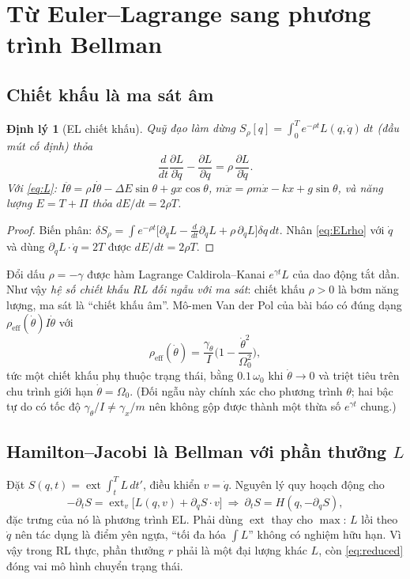 \documentclass[11pt,a4paper]{article}
\newtheorem{dinhly}{Định lý}
\theoremstyle{remark}
\begin{document}
\section{Từ Euler--Lagrange sang phương trình Bellman}
\subsection{Chiết khấu là ma sát âm}
\begin{dinhly}[EL chiết khấu]\label{th:disc}
Quỹ đạo làm dừng $S_\rho[q]=\int_0^Te^{-\rho t}L(q,\dot q)\,dt$ (đầu mút cố định) thỏa
\begin{equation}
\frac{d}{dt}\frac{\partial L}{\partial\dot q}-\frac{\partial L}{\partial q}=\rho\,\frac{\partial L}{\partial\dot q}.
\label{eq:ELrho}
\end{equation}
Với \eqref{eq:L}: $I\ddot\theta=\rho I\dot\theta-\Delta E\sin\theta+gx\cos\theta$, $m\ddot x=\rho m\dot x-kx+g\sin\theta$, và năng lượng $E=T+\Pi$ thỏa $dE/dt=2\rho T$.
\end{dinhly}
\begin{proof}
Biến phân: $\delta S_\rho=\int e^{-\rho t}\big[\partial_qL-\tfrac{d}{dt}\partial_{\dot q}L+\rho\,\partial_{\dot q}L\big]\delta q\,dt$. Nhân \eqref{eq:ELrho} với $\dot q$ và dùng $\partial_{\dot q}L\cdot\dot q=2T$ được $dE/dt=2\rho T$.
\end{proof}
Đổi dấu $\rho=-\gamma$ được hàm Lagrange Caldirola--Kanai $e^{\gamma t}L$ của dao động tắt dần. Như vậy \emph{hệ số chiết khấu RL đối ngẫu với ma sát}: chiết khấu $\rho>0$ là bơm năng lượng, ma sát là ``chiết khấu âm''. Mô-men Van der Pol của bài báo có đúng dạng $\rho_{\text{eff}}(\dot\theta)I\dot\theta$ với
\begin{equation}
\rho_{\text{eff}}(\dot\theta)=\frac{\gamma_\theta}{I}\Big(1-\frac{\dot\theta^2}{\Omega_0^2}\Big),
\label{eq:rhoeff}
\end{equation}
tức một chiết khấu phụ thuộc trạng thái, bằng $0.1\,\omega_0$ khi $\dot\theta\to0$ và triệt tiêu trên chu trình giới hạn $\dot\theta=\Omega_0$. (Đối ngẫu này chính xác cho phương trình $\theta$; hai bậc tự do có tốc độ $\gamma_\theta/I\ne\gamma_x/m$ nên không gộp được thành một thừa số $e^{\gamma t}$ chung.)

\subsection{Hamilton--Jacobi là Bellman với phần thưởng $L$}
Đặt $S(q,t)=\operatorname{ext}\int_t^TL\,dt'$, điều khiển $v=\dot q$. Nguyên lý quy hoạch động cho
\[
-\partial_tS=\operatorname{ext}_v\big[L(q,v)+\partial_qS\cdot v\big]\ \Longrightarrow\ \partial_tS=H(q,-\partial_qS),
\]
đặc trưng của nó là phương trình EL. Phải dùng $\operatorname{ext}$ thay cho $\max$: $L$ lồi theo $\dot q$ nên tác dụng là điểm yên ngựa, ``tối đa hóa $\int L$'' không có nghiệm hữu hạn. Vì vậy trong RL thực, phần thưởng $r$ phải là một đại lượng khác $L$, còn \eqref{eq:reduced} đóng vai mô hình chuyển trạng thái.
\end{document}

